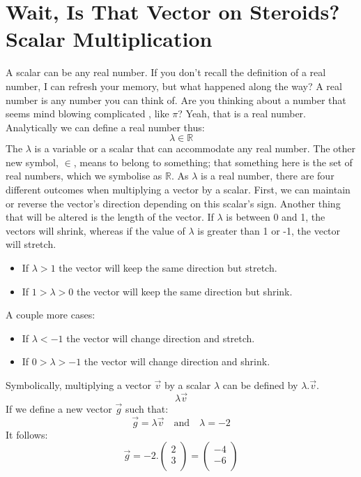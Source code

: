 \documentclass[a4,12pt,twosided,openany]{memoir}
\begin{document}
\section{Wait, Is That Vector on Steroids? Scalar Multiplication}
A scalar can be any real number. If you don’t recall the definition of a real number, I can refresh your memory, but what happened along the way? A real number is any number you can think of. Are you thinking about a number that seems mind blowing complicated , like $\pi$? Yeah, that is a real number. Analytically we can define a real number thus:
\[\lambda \in \mathbb{R}\]
The $\lambda$ is a variable or a scalar that can accommodate any real number. The other new symbol, $\in$, means to belong to something; that something here is the set of real numbers, which we symbolise as $\mathbb{R}$. As $\lambda$ is a real number, there are four different outcomes when multiplying a vector by a scalar. First, we can maintain or reverse the vector's direction depending on this scalar's sign. Another thing that will be altered is the length of the vector. If $\lambda$ is between 0 and 1, the vectors will shrink, whereas if the value of $\lambda$ is greater than 1 or -1, the vector will stretch.
\\
\begin{tcolorbox}
\begin{itemize}
\item If $\lambda >1 $ the vector will keep the same direction but stretch.
\item If $1 > \lambda > 0$ the vector will keep the same direction but shrink.
\end{itemize}
\end{tcolorbox}
\par 
\indent
A couple more cases:
\begin{tcolorbox}
\begin{itemize}
\item If $\lambda < -1$ the vector will change direction and stretch.
\item If $0 > \lambda > -1$ the vector will change direction and shrink.
\end{itemize}
\end{tcolorbox}
\par 
\indent
Symbolically, multiplying a vector $\overrightarrow{v}$ by a scalar $\lambda$ can be defined by $\lambda$.$\overrightarrow{v}$.
 \[\lambda \overrightarrow{v}\]
If we define a new vector $\overrightarrow{g}$ such that:
\[\overrightarrow{g} = \lambda \overrightarrow{v} \quad \textrm{and} \quad  \lambda = -2\]
It follows:
\[\overrightarrow{g} = -2.\begin{pmatrix}
 2\\
 3\\
\end{pmatrix} = \begin{pmatrix}
 -4\\
 -6\\
\end{pmatrix}\]
\end{document}
